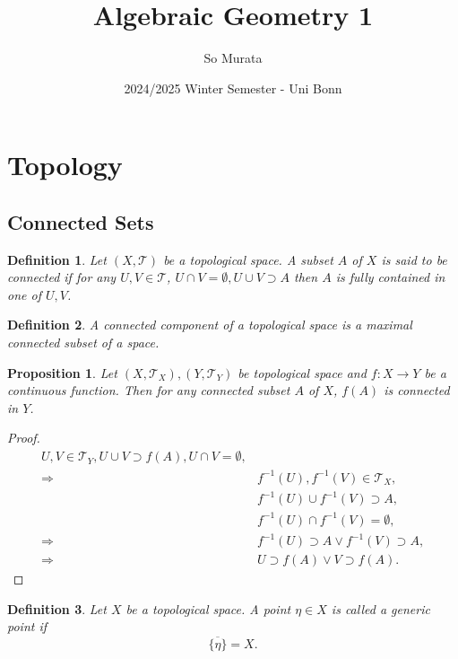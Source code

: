 \documentclass{article}
\title{Algebraic Geometry 1}
\author{So Murata}
\date{2024/2025 Winter Semester - Uni Bonn}
\newtheorem{proposition}{Proposition}[section]
\newtheorem{definition}{Definition}[section]
\numberwithin{equation}{section}
\begin{document}
\maketitle

\section{Topology}

\subsection{Connected Sets}

\begin{definition}
Let $(X,\mathcal{T})$ be a topological space. A subset $A$ of $X$ is said to be connected if for any $U,V\in\mathcal{T}$, $U\cap V=\emptyset, U\cup V\supset A$ then $A$ is fully contained in one of $U,V$. 
\end{definition}

\begin{definition}
A connected component of a topological space is a maximal connected subset of a space. 
\end{definition}

\begin{proposition}
Let $(X,\mathcal{T}_X),(Y,\mathcal{T}_Y)$ be topological space and $f:X\to Y$ be a continuous function. Then for any connected subset $A$ of $X$, $f(A)$ is connected in $Y$. 
\end{proposition}

\begin{proof}
\begin{align*}
U,V\in\mathcal{T}_Y, U\cup V\supset f(A), U\cap V=\emptyset, \\
 \Rightarrow &f^{-1}(U),f^{-1}(V)\in\mathcal{T}_X,\\
& f^{-1}(U)\cup f^{-1}(V)\supset A, \\
&f^{-1}(U)\cap f^{-1}(V)=\emptyset,\\
 \Rightarrow& f^{-1}(U)\supset A\lor f^{-1}(V)\supset A,\\
 \Rightarrow& U\supset f(A) \lor V\supset f(A).
\end{align*}
\end{proof}

\begin{definition}
Let $X$ be a topological space. A point $\eta\in X$ is called a generic point if 
\begin{equation*}
\overline{\{\eta\}} = X.
\end{equation*}
\end{definition}
\end{document}
